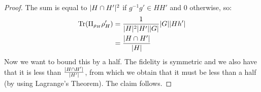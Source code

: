 \begin{proof}
    The sum is equal to $\lvert H \cap H' \rvert^2$ if $g^{-1}g' \in HH'$ and $0$ otherwise, so:
    \begin{align*}
        \mathrm{Tr}(\Pi_{\rho_H}\rho_H') &= \frac{1}{\lvert H \rvert^2\lvert H' \rvert\lvert G \rvert}\lvert G \rvert\lvert Hh' \rvert 
        \\ &= \frac{\lvert H\cap H' \rvert}{\lvert H \rvert}
    \end{align*}
    Now we want to bound this by a half. The fidelity is symmetric and we also have that it is less than $\frac{\lvert H \cap H' \rvert}{\lvert H' \rvert}$, from which we obtain that it must be less than a half (by using Lagrange's Theorem). The claim follows.
\end{proof}